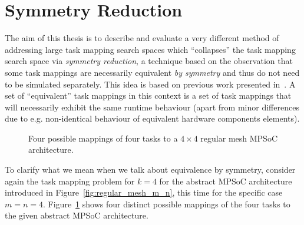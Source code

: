 \section{Symmetry Reduction}
\label{sec:mot_symmetry_reduction}

The aim of this thesis is to describe and evaluate a very different method of
addressing large task mapping search spaces which ``collapses'' the task
mapping search space via \textit{symmetry reduction}, a technique based on the
observation that some task mappings are necessarily equivalent \textit{by
symmetry} and thus do not need to be simulated separately. This idea is based
on previous work presented in~\cite{Goens}.
%
A set of ``equivalent'' task mappings in this context is a set of task mappings
that will necessarily exhibit the same runtime behaviour (apart from minor
differences due to e.g.  non-identical behaviour of equivalent hardware
components elements).

\begin{figure}
  \centering
  \begin{subfigure}{.4\textwidth}
    \caption{}
  \end{subfigure}
  \hspace*{\fill}
  \begin{subfigure}{.4\textwidth}
    \caption{}
  \end{subfigure}
  \begin{subfigure}{.4\textwidth}
    \caption{}
  \end{subfigure}
  \hspace*{\fill}
  \begin{subfigure}{.4\textwidth}
    \caption{}
  \end{subfigure}
  \caption{Four possible mappings of four tasks to a $4 \times 4$ regular mesh
           MPSoC architecture.}
  \label{fig:regular_mesh_4_4_mappings}
\end{figure}

To clarify what we mean when we talk about equivalence by symmetry, consider
again the task mapping problem for $k = 4$ for the abstract MPSoC architecture
introduced in Figure~\ref{fig:regular_mesh_m_n}, this time for the specific
case $m = n = 4$.  Figure~\ref{fig:regular_mesh_4_4_mappings} shows four
distinct possible mappings of the four tasks to the given abstract MPSoC
architecture.

